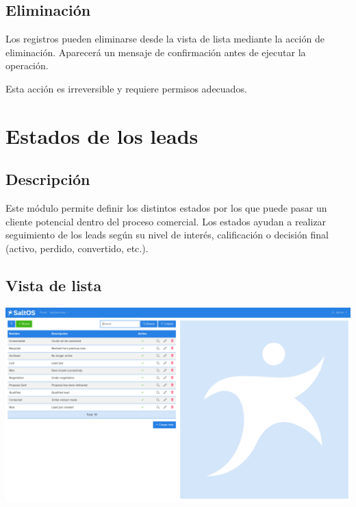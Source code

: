 \documentclass[a4paper]{article}
\begin{document}
\hypertarget{toc60}{}
\subsection{Eliminación}

Los registros pueden eliminarse desde la vista de lista mediante la acción de eliminación.
Aparecerá un mensaje de confirmación antes de ejecutar la operación.

Esta acción es irreversible y requiere permisos adecuados.


\hypertarget{toc61}{}
\section{Estados de los leads}

\hypertarget{toc62}{}
\subsection{Descripción}

Este módulo permite definir los distintos estados por los que puede pasar un cliente potencial dentro del proceso comercial.
Los estados ayudan a realizar seguimiento de los leads según su nivel de interés, calificación o decisión final (activo, perdido, convertido, etc.).

\hypertarget{toc63}{}
\subsection{Vista de lista}

\begin{center}\includegraphics[width=1\textwidth]{../ujest/snaps/test-screenshots-js-screenshots-crm-leads-status-list-es-es-1-snap.png}\end{center}
\end{document}
